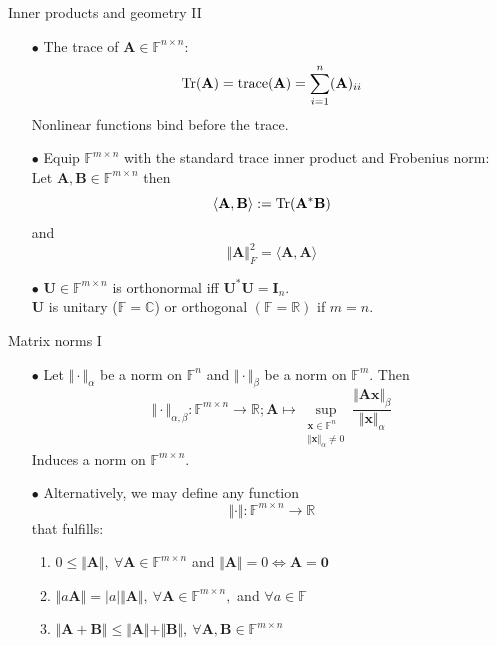 \documentclass{beamer}
\newcommand{\bgk}[1]{\boldsymbol{#1}}
\newcommand{\bzero}{\bgk{0}}
\newcommand{\bvec}[1]{\mathbf{#1}}
\newcommand{\vx}{\bvec{x}}
\newcommand{\vA}{\bvec{A}}
\newcommand{\vB}{\bvec{B}}
\newcommand{\vI}{\bvec{I}}
\newcommand{\vU}{\bvec{U}}
\begin{document}
\begin{frame}{Inner products and geometry II}

\begin{itemize}
    \item[$\bullet$] The trace of $\vA \in \mathbb{F}^{n\times n}$: 
    $$
    {\rm Tr}(\vA) = {\rm trace} (\vA) = \sum_{i=1}^n (\vA)_{ii}
    $$
    Nonlinear functions bind before the trace.
    \item[$\bullet$] Equip $\mathbb{F}^{m\times n}$ with the standard trace inner product and Frobenius norm:\\
    Let $\vA, \vB \in \mathbb{F}^{m \times n}$ then
    $$\langle \vA, \vB  \rangle := {\rm Tr} (\vA^* \vB)$$
    and
    $$
    \Vert \vA \Vert_{F}^2 =  \langle \vA, \vA  \rangle
    $$
    \item[$\bullet$] $\vU \in \mathbb{F}^{m \times n}$ is orthonormal iff $\vU^* \vU = \vI_{n}$.\\ 
    $\vU$ is unitary ($\mathbb{F} = \mathbb{C}$) or orthogonal $(\mathbb{F} = \mathbb{R})$ if $m=n$.  
\end{itemize}
    
\end{frame}

\begin{frame}{Matrix norms I}

\begin{itemize}
\item[$\bullet$] Let $\Vert \cdot \Vert_{\alpha}$ be a norm on $\mathbb{F}^n$ and $\Vert \cdot \Vert_{\beta}$ be a norm on $\mathbb{F}^m$. Then
$$
\Vert \cdot \Vert_{\alpha, \beta}:\mathbb{F}^{m \times n} \to \mathbb{R}
; \vA \mapsto \sup_{\substack{\vx\in\mathbb{F}^n \\ \Vert \vx \Vert_\alpha \neq 0}}
\frac{\Vert \vA \vx \Vert_{\beta}}{\Vert \vx \Vert_\alpha}
$$
Induces a norm on $\mathbb{F}^{m \times n}$.
\item[$\bullet$] Alternatively, we may define any function
$$
\Vert \cdot \Vert : \mathbb{F}^{m \times n} \to \mathbb{R}
$$
that fulfills:
\begin{enumerate}
    \item $0 \leq \Vert \vA \Vert,~ \forall \vA \in \mathbb{F}^{m \times n}$ and $\Vert \vA \Vert = 0  \Leftrightarrow \vA = \bzero$
    \item $\Vert a \vA \Vert = |a| \Vert \vA \Vert,~ \forall \vA \in \mathbb{F}^{m \times n},$ and $\forall a\in\mathbb{F}$
    \item $\Vert \vA + \vB \Vert \leq \Vert \vA \Vert + \Vert \vB \Vert,~\forall \vA, \vB \in \mathbb{F}^{m \times n}$
\end{enumerate}
\end{itemize}

\end{frame}
\end{document}

